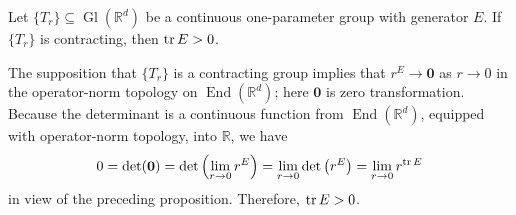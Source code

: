 \documentclass[smallextended]{svjour3}
\theoremstyle{remark}
\renewenvironment{proof}[1][\proofname]{\renewcommand\xproofname{#1}\xproof}{\endxproof}
\newcommand\End{\operatorname{End}} %
\newcommand\Gl{\operatorname{Gl}} %
\renewcommand\det{\operatorname{det}}
\begin{document}
\begin{proposition}\label{prop:ContractingTrace}
Let $\{T_r\}\subseteq \Gl(\mathbb{R}^d)$ be a continuous one-parameter group with generator $E$. If $\{T_r\}$ is  contracting, then $\tr E>0$. 
\end{proposition}
\begin{proof}
The supposition that $\{T_r\}$ is a contracting group implies that $r^E\to \mathbf{0}$ as $r\to 0$ in the operator-norm topology on $\End(\mathbb{R}^d)$; here $\mathbf{0}$ is zero transformation. Because the determinant is a continuous function from $\End(\mathbb{R}^d)$, equipped with operator-norm topology, into $\mathbb{R}$, we have
\begin{equation*}
0=\det(\mathbf{0})=\det\left(\lim_{r\to 0}r^E\right)=\lim_{r\to 0}\det\left(r^E\right)=\lim_{r\to 0}r^{\tr E}
\end{equation*}
in view of the preceding proposition. Therefore, $\tr E>0$.
\end{proof}























\end{document}
